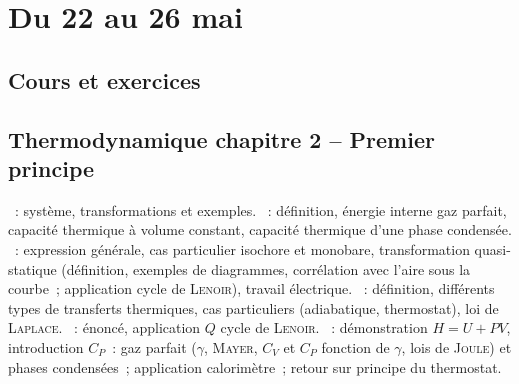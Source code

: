\documentclass[a4paper, 12pt, final, garamond]{book}
\begin{document}
\setcounter{chapter}{26}

\chapter{Du 22 au 26 mai}

\section{Cours et exercices}

\section*{Thermodynamique chapitre 2 -- Premier principe}
\begin{enumerate}[label=\Roman*]
  ~: système, transformations et exemples.
  ~: définition, énergie interne gaz parfait, capacité
    thermique à volume constant, capacité thermique d'une phase condensée.
  ~: expression générale, cas particulier
    isochore et monobare, transformation quasi-statique (définition, exemples de
    diagrammes, corrélation avec l'aire sous la courbe~; application cycle de
    \textsc{Lenoir}), travail électrique.
  ~: définition, différents types de transferts
    thermiques, cas particuliers (adiabatique, thermostat), loi de
    \textsc{Laplace}.
  ~: énoncé, application $Q$ cycle
    de \textsc{Lenoir}.
  ~: démonstration $H = U+PV$,
    introduction $C_{P}$~: gaz parfait ($\gamma$, \textsc{Mayer}, $C_{V}$ et
    $C_P$ fonction de $\gamma$, lois de \textsc{Joule}) et phases condensées~;
    application calorimètre~; retour sur principe du thermostat.
\end{enumerate}
\end{document}
